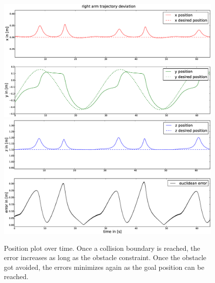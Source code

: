 \begin{figure}[h!]
  \centering
    \includegraphics[width=\textwidth]{../figures/arm_moves/position1.eps}
    \includegraphics[width=\textwidth]{../figures/arm_moves/position2.eps}
    \caption{Position plot over time. Once a collision boundary is reached, the error increases as long as the obstacle constraint. Once the obstacle got avoided, the errors minimizes again as the goal position can be reached.}
    \label{fig:externalposition}
\end{figure}
\clearpage

